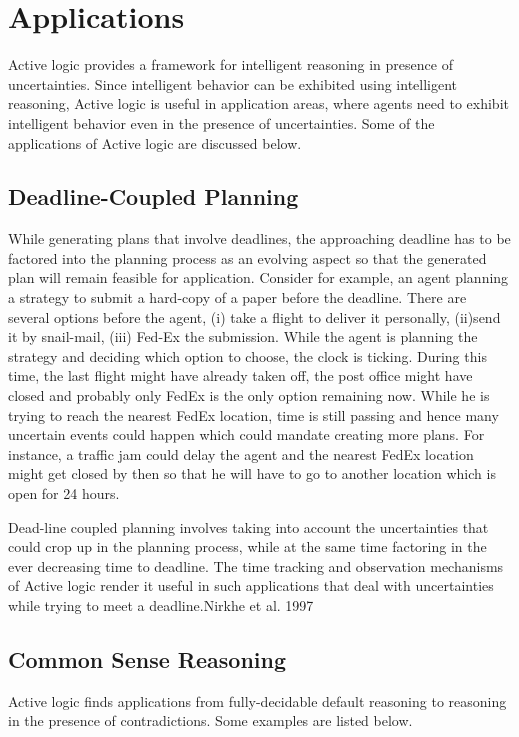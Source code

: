 \documentclass{article}
\begin{document}
\section{Applications}

Active logic provides a framework for intelligent reasoning in
presence of uncertainties. Since
intelligent behavior can be exhibited using intelligent reasoning,
Active logic is useful in application areas,
where agents need to exhibit intelligent behavior even in the presence
of uncertainties. Some of the
applications of Active logic are discussed below.

\subsection{Deadline-Coupled Planning}
While generating plans that involve deadlines, the approaching
	deadline has to be factored into the planning process as an
	evolving aspect  so
	that the generated plan will remain feasible for application. Consider for
	example, an agent planning a strategy to submit a hard-copy of
	a paper before the deadline. There are several options before the
	agent, (i) take a flight to deliver it personally, (ii)send it by
	snail-mail, (iii) Fed-Ex the submission. While the agent is
	planning the strategy and deciding which option to choose,
	the clock is ticking. During this time, the last flight might
	have already taken
	off, the post office might have closed and probably only FedEx
	is the only option remaining now. While he is trying to reach the nearest
	FedEx location, time is still passing and hence many uncertain
	events could happen which could mandate creating more
	plans. For instance, a traffic jam could delay the agent and
	the nearest FedEx location might get closed by then so that he
	will have to go to another location which is open for 24
	hours. 


Dead-line coupled planning involves taking into
account the uncertainties that could crop up in the planning process, while at the same time factoring in the ever decreasing time
to deadline. The time tracking and observation mechanisms of Active logic render it useful in such
applications that deal with uncertainties while trying to meet a
deadline.{Nirkhe et al. 1997}

\subsection{Common Sense Reasoning}
Active logic finds applications from fully-decidable default reasoning
to reasoning in the presence of contradictions. Some examples are
listed below.
\end{document}
